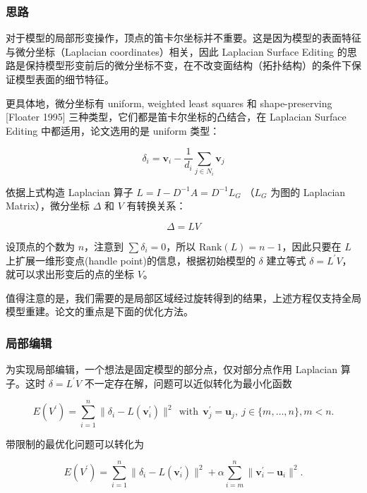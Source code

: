 \documentclass[lang=cn,11pt,a4paper]{elegantpaper}
\begin{document}
\subsubsection{思路}

对于模型的局部形变操作，顶点的笛卡尔坐标并不重要。这是因为模型的表面特征与{\heiti 微分坐标}（Laplacian coordinates）相关，因此 Laplacian Surface Editing 的思路是保持模型形变前后的微分坐标不变，{\heiti 在不改变面结构（拓扑结构）的条件下}保证模型表面的细节特征。

更具体地，微分坐标有 uniform, weighted least squares 和 shape-preserving [Floater 1995] 三种类型，它们都是笛卡尔坐标的凸结合，在 Laplacian Surface Editing 中都适用，论文选用的是 uniform 类型：

\begin{equation}
    \delta_i = \mathbf{v}_{i}-\frac{1}{d_{i}} \sum_{j \in {N}_{i}} \mathbf{v}_{j}
\end{equation}

依据上式构造 Laplacian 算子 $L = I - D^{-1} A = D^{-1} L_G$ （$L_G$ 为图的 Laplacian Matrix），微分坐标 $\Delta$ 和 $V$ 有转换关系：

\begin{equation}
    \Delta = L V
\end{equation}

设顶点的个数为 $n$，注意到 $\sum\delta_i = 0$，所以 $\text{Rank}(L) = n-1$，因此只要在 $L$ 上扩展一维形变点(handle point)的信息，根据初始模型的 $\delta$ 建立等式 $\delta = L^{\prime} V$，就可以求出形变后的点的坐标 $V$。

值得注意的是，我们需要的是{\heiti 局部区域}经过{\heiti 旋转}得到的结果，上述方程仅支持全局模型重建。论文的重点是下面的优化方法。

\subsubsection{局部编辑}

为实现局部编辑，一个想法是固定模型的部分点，仅对部分点作用 Laplacian 算子。这时 $\delta = L^{\prime} V$ 不一定存在解，问题可以近似转化为最小化函数

\begin{equation}
    E(V^{\prime})=\sum_{i=1}^{n} \| \delta_{i}-L(\mathbf{v}_{i}^{\prime})\|^{2}\ \  \mathrm{with}\ \  \mathbf{v}_{j}^{\prime}=\mathbf{u}_{j}, \ j \in\{m, \ldots, n\}, m<n.
\end{equation}

带限制的最优化问题可以转化为

\begin{equation}
    E(V^{\prime})=\sum_{i=1}^{n} \| \delta_{i}-L(\mathbf{v}_{i}^{\prime})\|^{2}+ \alpha \sum_{i=m}^{n}\| \mathbf{v}_{i}^{\prime}-\mathbf{u}_{i} \|^{2}.
\end{equation}
\end{document}
